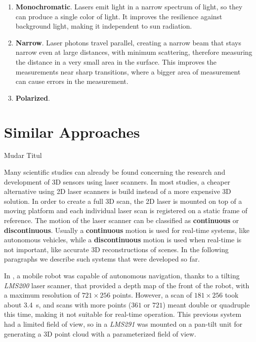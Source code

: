 \begin{enumerate}
    \item \textbf{Monochromatic}. Lasers emit light in a narrow spectrum of light, so they can produce a single color of light. It improves the resilience against background light, making it independent to sun radiation.
    \item \textbf{Narrow}. Laser photons travel parallel, creating a narrow beam that stays narrow even at large distances, with minimum scattering, therefore measuring the distance in a very small area in the surface. This improves the measurements near sharp transitions, where a bigger area of measurement can cause errors in the measurement. 
    \item \textbf{Polarized}. 
\end{enumerate}


\section{Similar Approaches}

{\Huge Mudar Titul}


Many scientific studies can already be found concerning the research and development of 3D sensors using laser scanners. In most studies, a cheaper alternative using 2D laser scanners is build instead of a more expensive 3D solution. In order to create a full 3D scan, the 2D laser is mounted on top of a moving platform and each individual laser scan is registered on a static frame of reference. The motion of the laser scanner can be classified as \textbf{continuous} or \textbf{discontinuous}. Usually a \textbf{continuous} motion is used for real-time systems, like autonomous vehicles, while a \textbf{discontinuous} motion is used when real-time is not important, like accurate 3D reconstructions of scenes. In the following paragraphs we describe such systems that were developed so far.

In \cite{surmann2003}, a mobile robot was capable of autonomous navigation, thanks to a tilting \textit{LMS200} laser scanner, that provided a depth map of the front of the robot, with a maximum resolution of $721\times256$ points. However, a scan of $181\times256$ took about \SI{3.4}{\second}, and scans with more points ($361$ or $721$) meant double or quadruple this time, making it not suitable for real-time operation. This previous system had a limited field of view, so in \cite{zcai05} a \textit{LMS291} was mounted on a pan-tilt unit for generating a 3D point cloud with a parameterized field of view.

